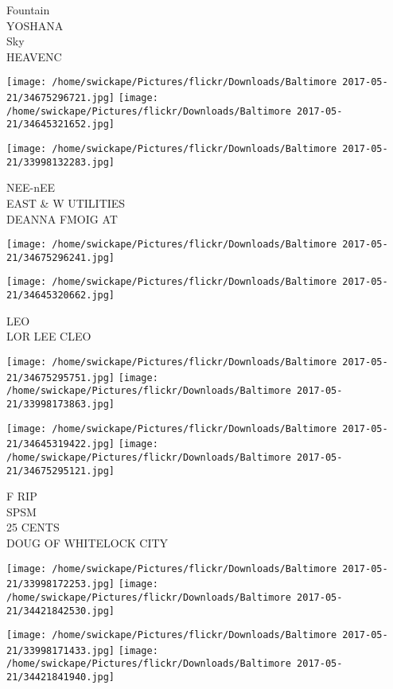\documentclass[10pt,letterpaper]{article}
\begin{document}
Fountain\\
YOSHANA\\
Sky\\
HEAVENC\\
\pagebreak

\texttt{[image: /home/swickape/Pictures/flickr/Downloads/Baltimore 2017-05-21/34675296721.jpg]}
\texttt{[image: /home/swickape/Pictures/flickr/Downloads/Baltimore 2017-05-21/34645321652.jpg]}

\vspace{0.25in}
\texttt{[image: /home/swickape/Pictures/flickr/Downloads/Baltimore 2017-05-21/33998132283.jpg]}

NEE{-}nEE\\
EAST \& W UTILITIES\\
DEANNA FMOIG AT\\
\pagebreak

\texttt{[image: /home/swickape/Pictures/flickr/Downloads/Baltimore 2017-05-21/34675296241.jpg]}

\vspace{0.25in}
\texttt{[image: /home/swickape/Pictures/flickr/Downloads/Baltimore 2017-05-21/34645320662.jpg]}

LEO\\
LOR LEE CLEO\\
\pagebreak

\texttt{[image: /home/swickape/Pictures/flickr/Downloads/Baltimore 2017-05-21/34675295751.jpg]}
\texttt{[image: /home/swickape/Pictures/flickr/Downloads/Baltimore 2017-05-21/33998173863.jpg]}

\texttt{[image: /home/swickape/Pictures/flickr/Downloads/Baltimore 2017-05-21/34645319422.jpg]}
\texttt{[image: /home/swickape/Pictures/flickr/Downloads/Baltimore 2017-05-21/34675295121.jpg]}

F RIP\\
SPSM\\
25 CENTS\\
DOUG OF WHITELOCK CITY\\
\pagebreak

\texttt{[image: /home/swickape/Pictures/flickr/Downloads/Baltimore 2017-05-21/33998172253.jpg]}
\texttt{[image: /home/swickape/Pictures/flickr/Downloads/Baltimore 2017-05-21/34421842530.jpg]}

\texttt{[image: /home/swickape/Pictures/flickr/Downloads/Baltimore 2017-05-21/33998171433.jpg]}
\texttt{[image: /home/swickape/Pictures/flickr/Downloads/Baltimore 2017-05-21/34421841940.jpg]}
\end{document}
